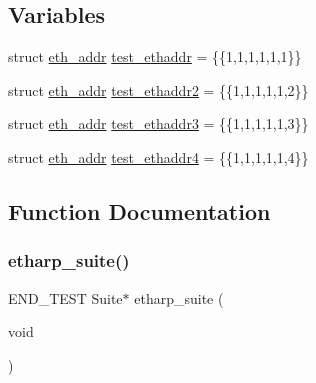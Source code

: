 \subsection*{Variables}
\begin{DoxyCompactItemize}
\item 
struct \hyperlink{structeth__addr}{eth\+\_\+addr} \hyperlink{openmote-cc2538_2lwip_2test_2unit_2etharp_2test__etharp_8c_aa3def32652a7fab7e81bf617bf576d5d}{test\+\_\+ethaddr} = \{\{1,1,1,1,1,1\}\}
\item 
struct \hyperlink{structeth__addr}{eth\+\_\+addr} \hyperlink{openmote-cc2538_2lwip_2test_2unit_2etharp_2test__etharp_8c_a03611d55f17417c0eb7a4fcfb6cb5623}{test\+\_\+ethaddr2} = \{\{1,1,1,1,1,2\}\}
\item 
struct \hyperlink{structeth__addr}{eth\+\_\+addr} \hyperlink{openmote-cc2538_2lwip_2test_2unit_2etharp_2test__etharp_8c_a2c84d503553a537ac3df4ccc086cbfdc}{test\+\_\+ethaddr3} = \{\{1,1,1,1,1,3\}\}
\item 
struct \hyperlink{structeth__addr}{eth\+\_\+addr} \hyperlink{openmote-cc2538_2lwip_2test_2unit_2etharp_2test__etharp_8c_afe6417ab6a451af526194cd2867e4b73}{test\+\_\+ethaddr4} = \{\{1,1,1,1,1,4\}\}
\end{DoxyCompactItemize}


\subsection{Function Documentation}
\mbox{\label{openmote-cc2538_2lwip_2test_2unit_2etharp_2test__etharp_8c_a79605956fdd081741a16545c0adf0168}} 
\subsubsection{\texorpdfstring{etharp\+\_\+suite()}{etharp\_suite()}}
{\footnotesize\ttfamily E\+N\+D\+\_\+\+T\+E\+ST Suite$\ast$ etharp\+\_\+suite (\begin{DoxyParamCaption}\item[{void}]{ }\end{DoxyParamCaption})}

